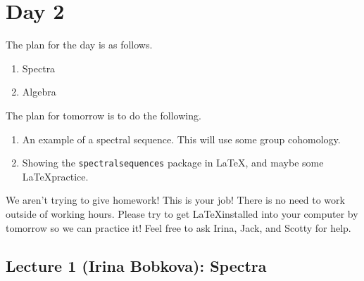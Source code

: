 \section{Day 2}
The plan for the day is as follows. 
\begin{enumerate}
    \item Spectra
    \item Algebra
\end{enumerate}
The plan for tomorrow is to do the following. 
\begin{enumerate}
    \item An example of a spectral sequence. This will use some group cohomology.
    \item Showing the \texttt{spectralsequences} package in \LaTeX, and maybe some \LaTeX practice.
\end{enumerate}
We aren't trying to give homework! This is your job! There is no need to work outside of working hours. Please try to get \LaTeX installed into your computer by tomorrow so we can practice it! Feel free to ask Irina, Jack, and Scotty for help. 

\lineyspace
\subsection{Lecture 1 (Irina Bobkova): Spectra}

